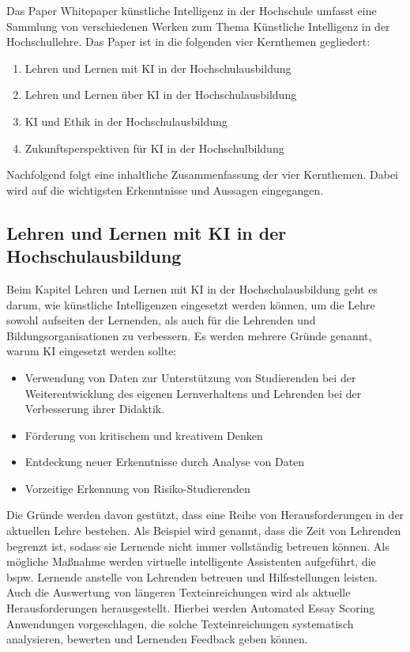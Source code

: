 
Das Paper \glqq{}Whitepaper künstliche Intelligenz in der Hochschule\grqq{} umfasst eine Sammlung von verschiedenen Werken zum Thema Künstliche Intelligenz in der Hochschullehre. Das Paper ist in die folgenden vier Kernthemen gegliedert:
\begin{enumerate}
    \item Lehren und Lernen mit KI in der Hochschulausbildung
    \item Lehren und Lernen über KI in der Hochschulausbildung
    \item KI und Ethik in der Hochschulausbildung
    \item Zukunftsperspektiven für KI in der Hochschulbildung
\end{enumerate}

Nachfolgend folgt eine inhaltliche Zusammenfassung der vier Kernthemen. Dabei wird auf die wichtigsten Erkenntnisse und Aussagen eingegangen.


\subsection{Lehren und Lernen mit KI in der Hochschulausbildung}
Beim Kapitel \glqq{}Lehren und Lernen mit KI in der Hochschulausbildung\grqq{} geht es darum, wie künstliche Intelligenzen eingesetzt werden können, um die Lehre sowohl aufseiten der Lernenden, als auch für die Lehrenden und Bildungsorganisationen zu verbessern. Es werden mehrere Gründe genannt, warum KI eingesetzt werden sollte:
\begin{itemize}
    \item Verwendung von Daten zur Unterstützung von Studierenden bei der Weiterentwicklung des eigenen Lernverhaltens und Lehrenden bei der Verbesserung ihrer Didaktik.
    \item Förderung von kritischem und kreativem Denken
    \item Entdeckung neuer Erkenntnisse durch Analyse von Daten
    \item Vorzeitige Erkennung von Risiko-Studierenden
\end{itemize}

Die Gründe werden davon gestützt, dass eine Reihe von Herausforderungen in der aktuellen Lehre bestehen. Als Beispiel wird genannt, dass die Zeit von Lehrenden begrenzt ist, sodass sie Lernende nicht immer vollständig betreuen können. Als mögliche Maßnahme werden virtuelle intelligente Assistenten aufgeführt, die bspw. Lernende anstelle von Lehrenden betreuen und Hilfestellungen leisten. Auch die Auswertung von längeren Texteinreichungen wird als aktuelle Herausforderungen herausgestellt. Hierbei werden Automated Essay Scoring Anwendungen vorgeschlagen, die solche Texteinreichungen systematisch analysieren, bewerten und Lernenden Feedback geben können.

